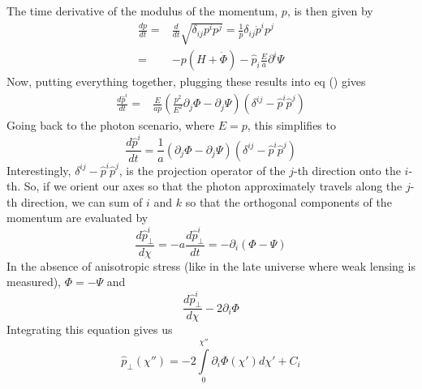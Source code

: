 The time derivative of the modulus of the momentum, $p$, is then given by
\begin{equation}
	\begin{split}
		\frac{dp}{dt} =& \frac{d}{dt}\sqrt{\delta_{ij}p^ip^j} = \frac{1}{p}\delta_{ij}\dot p^i p^j \\
		=& -p(H+\dot\Phi) - \hat{p}_i\frac{E}{a}\partial^i\Psi
	\end{split}
\end{equation}
Now, putting everything together, plugging these results into eq () gives
\begin{equation}
	\begin{split}
		\frac{d\hat{p}^i}{dt} %
		=&  \frac{E}{ap}\left( \frac{p^2}{E^2}\partial_j\Phi - \partial_j\Psi \right)(\delta^{ij}-\hat{p}^i\hat{p}^j)
	\end{split}
\end{equation} 
Going back to the photon scenario, where $E=p$, this simplifies to
\begin{equation}
	\frac{d\hat{p}^i}{dt} = \frac{1}{a}\left( \partial_j\Phi - \partial_j\Psi \right)(\delta^{ij}-\hat{p}^i\hat{p}^j)
\end{equation}
Interestingly, $\delta^{ij}-\hat p^i \hat p^j$, is the projection operator of the $j$-th direction onto the $i$-th. So, if we orient our axes so that the photon approximately travels along the $j$-th direction, we can sum of $i$ and $k$ so that the orthogonal components of the momentum are evaluated by
\begin{equation}
	\frac{d\hat{p}^i_\perp}{d\chi} = - a \frac{d\hat{p}^i_\perp}{dt} = -\partial_i(\Phi-\Psi)
\end{equation}
In the absence of anisotropic stress (like in the late universe where weak lensing is measured), $\Phi=-\Psi$ and 
\begin{equation}
	\frac{d\hat{p}^i_\perp}{d\chi} -2\partial_i\Phi
\end{equation}
Integrating this equation gives us
\begin{equation}
	\hat p_\perp (\chi'') = -2\int\limits_0^{\chi''}\partial_i\Phi(\chi') d\chi' + C_i
\end{equation}

